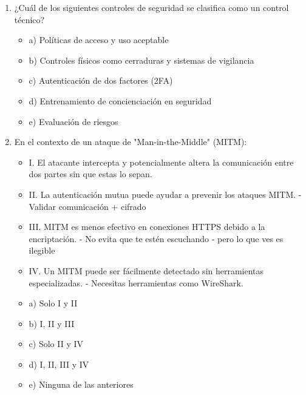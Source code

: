 \documentclass[a4paper]{article}
\begin{document}
\begin{enumerate}
    \item ¿Cuál de los siguientes controles de seguridad se clasifica como un control técnico?
    \begin{itemize}
        \item a) Políticas de acceso y uso aceptable
        \item b) Controles físicos como cerraduras y sistemas de vigilancia
        \item c) Autenticación de dos factores (2FA)
        \item d) Entrenamiento de concienciación en seguridad
        \item e) Evaluación de riesgos
    \end{itemize}
    
    \item En el contexto de un ataque de "Man-in-the-Middle" (MITM):
    \begin{itemize}
        \item I. El atacante intercepta y potencialmente altera la comunicación entre dos partes sin que estas lo sepan.
        \item II. La autenticación mutua puede ayudar a prevenir los ataques MITM. - Validar comunicación + cifrado
        \item III. MITM es menos efectivo en conexiones HTTPS debido a la encriptación. - No evita que te estén escuchando - pero lo que ves es ilegible
        \item IV. Un MITM puede ser fácilmente detectado sin herramientas especializadas. - Necesitas herramientas como WireShark.
    \end{itemize}
    \begin{itemize}
        \item a) Solo I y II
        \item b) I, II y III
        \item c) Solo II y IV
        \item d) I, II, III y IV
        \item e) Ninguna de las anteriores
    \end{itemize}
    

\end{enumerate}
\end{document}
